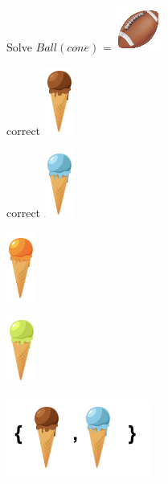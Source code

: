 \documentclass{ximera}
\begin{document}
\begin{question}
Solve $Ball(cone)$ = \includegraphics{pics/foot_ball.png}
\begin{selectAll}
\item[correct] {\includegraphics{pics/cone_1.png}}
\item[correct] {\includegraphics{pics/cone_2.png}}
\item {\includegraphics{pics/cone_3.png}}
\item {\includegraphics{pics/cone_4.png}}
\end{selectAll}
\begin{feedback}
\includegraphics{pics/A_2.png}
\end{feedback}
\end{question}

\quad \\
\end{document}
